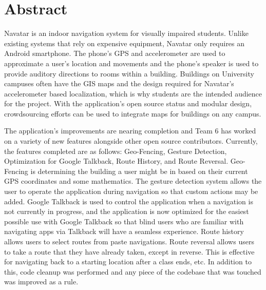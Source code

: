 \documentclass{scrreprt}
\begin{document}
	\section{Abstract}
Navatar is an indoor navigation system for visually impaired students. Unlike existing systems that rely on expensive equipment, Navatar only requires an Android smartphone. The phone’s GPS and accelerometer are used to approximate a user's location and movements and the phone’s speaker is used to provide auditory directions to rooms within a building. Buildings on University campuses often have the GIS maps and the design required for Navatar’s accelerometer based localization, which is why students are the intended audience for the project. With the application’s open source status and modular design, crowdsourcing efforts can be used to integrate maps for buildings on any campus.\begin{highlightbox}The application's improvements are nearing completion and Team 6 has worked on a variety of new features alongside other open source contributors. Currently, the features completed are as follows: Geo-Fencing, Gesture Detection, Optimization for Google Talkback, Route History, and Route Reversal. Geo-Fencing is determining the building a user might be in based on their current GPS coordinates and some mathematics. The gesture detection system allows the user to operate the application during navigation so that custom actions may be added. Google Talkback is used to control the application when a navigation is not currently in progress, and the application is now optimized for the easiest possible use with Google Talkback so that blind users who are familiar with navigating apps via Talkback will have a seamless experience. Route history allows users to select routes from paste navigations. Route reversal allows users to take a route that they have already taken, except in reverse. This is effective for navigating back to a starting location after a class ends, etc. In addition to this, code cleanup was performed and any piece of the codebase that was touched was improved as a rule.\end{highlightbox}
\pagebreak
\end{document}
